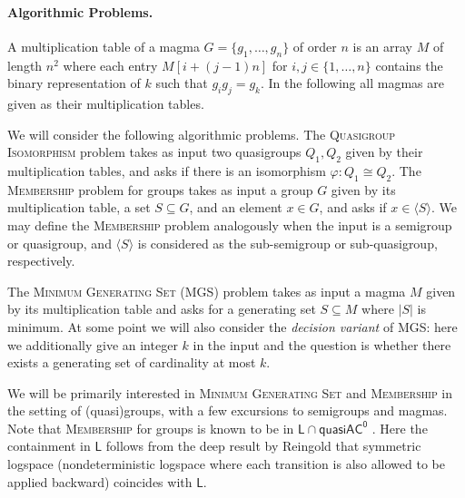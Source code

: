 \documentclass{theoretics}
\newcommand{\algprobm}[1]{\textsc{#1}\xspace}
\newcommand*{\ComplexityClass}[1]{\ensuremath{\mathsf{#1}}\xspace}
\newcommand*{\LogSpace}{\ComplexityClass{L}}
\newcommand{\qACz}{\ComplexityClass{quasiAC^0}}
\begin{document}
\paragraph{Algorithmic Problems.} 
A multiplication table of a magma $G = \{g_1, \dots, g_n\}$ of order $n$ is an array $M$ of length $n^2$ where each entry $M[i+(j-1)n]$ for $i,j \in \{1, \dots, n\}$ contains the binary representation of $k$ such that $g_ig_j= g_k$. In the following all magmas are given as their multiplication tables.

We will consider the following algorithmic problems. The \algprobm{Quasigroup Isomorphism} problem takes as input two quasigroups $Q_{1}, Q_{2}$ given by their multiplication tables, and asks if there is an isomorphism $\varphi : Q_{1} \cong Q_{2}$. The \algprobm{Membership} problem for groups takes as input a group $G$ given by its multiplication table, a set $S \subseteq G$, and an element $x \in G$, and asks if $x \in \langle S \rangle$. We may define the \algprobm{Membership} problem analogously when the input is a semigroup or quasigroup, and $\langle S \rangle$ is considered as the sub-semigroup or sub-quasigroup, respectively.

The \algprobm{Minimum Generating Set} (\algprobm{MGS}) problem takes as input a magma $M$ given by its multiplication table and asks for a generating set $S \subseteq M$ where $|S|$ is minimum. At some point we will also consider the \emph{decision variant} of \algprobm{MGS}: here we additionally give an integer $k$ in the input and the question is whether there exists a generating set of cardinality at most $k$.

We will be primarily interested in \algprobm{Minimum Generating Set} and \algprobm{Membership} in the setting of (quasi)groups,  with a few excursions to semigroups and magmas. Note that \algprobm{Membership} for groups is known to be in $\LogSpace \cap \qACz$ \cite{BarringtonMcKenzie, Reingold, Fleischer}. Here the containment in \LogSpace follows from the deep result by Reingold \cite{Reingold} that symmetric logspace (nondeterministic logspace where each transition is also allowed to be applied backward) coincides with \LogSpace.
\end{document}
